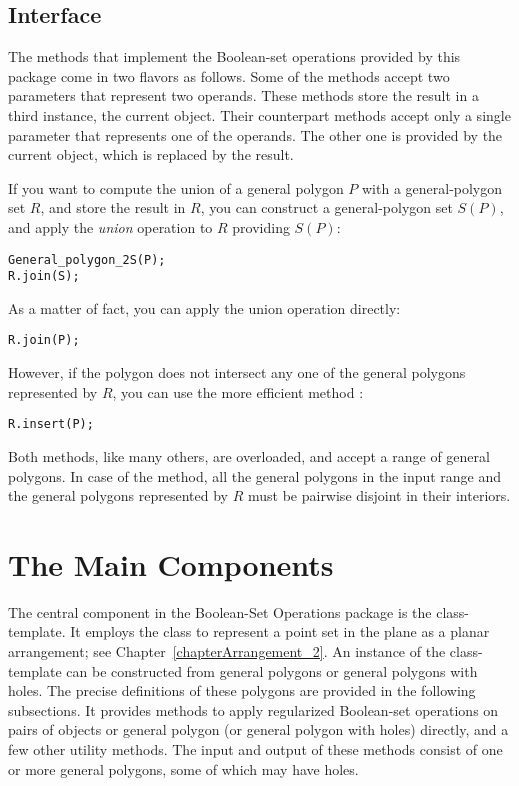 \subsection{Interface}
\label{bobs_ssec:interface}
The methods that implement the Boolean-set operations provided by this
package come in two flavors as follows. Some of the methods accept two
parameters that represent two operands. These methods store the result
in a third instance, the current object. Their counterpart methods
accept only a single parameter that represents one of the operands.
The other one is provided by the current object, which is replaced by
the result.

If you want to compute the union of a general polygon $P$ with a
general-polygon set $R$, and store the result in $R$, you can construct
a general-polygon set $S(P)$, and apply the {\em union} operation to
$R$ providing $S(P)$:

\begin{alltt}
General_polygon_2 S(P);
R.join(S);
\end{alltt}

As a matter of fact, you can apply the union operation directly:

\begin{alltt}
R.join(P);
\end{alltt}

However, if the polygon does not intersect any one of the general
polygons represented by $R$, you can use the more efficient method
:

\begin{alltt}
R.insert(P);
\end{alltt}

Both methods, like many others, are overloaded, and accept a range of
general polygons. In case of the  method, all the general
polygons in the input range and the general polygons represented by
$R$ must be pairwise disjoint in their interiors.

\section{The Main Components}
\label{bobs_sec:main_components}
The central component in the Boolean-Set Operations package is the
 class-template. It employs the
 class to represent a point set in the plane as a
planar arrangement; see Chapter~\ref{chapterArrangement_2}. 
An instance of the  class-template can be
constructed from general polygons or general polygons with holes. The
precise definitions of these polygons are provided in the following
subsections. It provides methods to apply regularized Boolean-set
operations on pairs of  objects or general
polygon (or general polygon with holes) directly, and a few other utility
methods. The input and output of these methods consist of one or more
general polygons, some of which may have holes.

